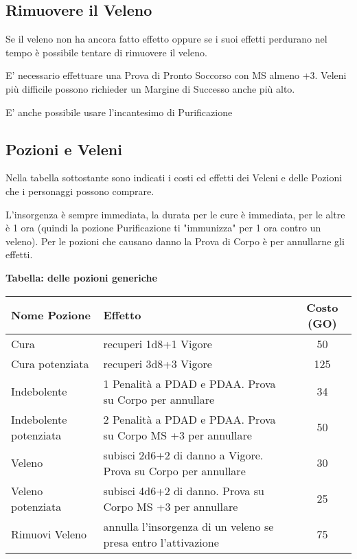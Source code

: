 \documentclass[12pt,a4paper,twoside,openany]{book}
\begin{document}
\begin{multicols}{2}
\subsection{Rimuovere il Veleno}

Se il veleno non ha ancora fatto effetto oppure se i suoi effetti perdurano nel tempo è possibile tentare di rimuovere il veleno.

E' necessario effettuare una Prova di Pronto Soccorso con MS almeno +3. Veleni più difficile possono richieder un Margine di Successo anche più alto.

E' anche possibile usare l'incantesimo di Purificazione

\subsection{Pozioni e Veleni}

Nella tabella sottostante sono indicati i costi ed effetti dei Veleni e delle Pozioni che i personaggi possono comprare.

L'insorgenza è sempre immediata, la durata per le cure è immediata, per le altre è 1 ora (quindi la pozione Purificazione ti "immunizza" per 1 ora contro un veleno). Per le pozioni che causano danno la Prova di Corpo è per annullarne gli effetti.

\textbf{Tabella: delle pozioni generiche}\label{pozionigeneriche}

\medskip

\end{multicols}

\begin{tabularx}{0.95\textwidth}{lXc}
\textbf{Nome Pozione}&  \textbf{Effetto}&  \textbf{Costo (GO)}\\
\toprule
Cura& recuperi 1d8+1 Vigore & 50\\
Cura potenziata& recuperi 3d8+3 Vigore& 125 \\
Indebolente& 1 Penalità a PDAD e PDAA. Prova su Corpo per annullare & 34\\
Indebolente potenziata& 2 Penalità a PDAD e PDAA. Prova su Corpo MS +3 per annullare & 50\\
Veleno& subisci 2d6+2 di danno a Vigore. Prova su Corpo per annullare & 30 \\
Veleno potenziata& subisci 4d6+2 di danno. Prova su Corpo MS +3 per annullare & 25 \\
Rimuovi Veleno& annulla l'insorgenza di un veleno se presa entro l'attivazione & 75 \\
\end{tabularx}
\end{document}
